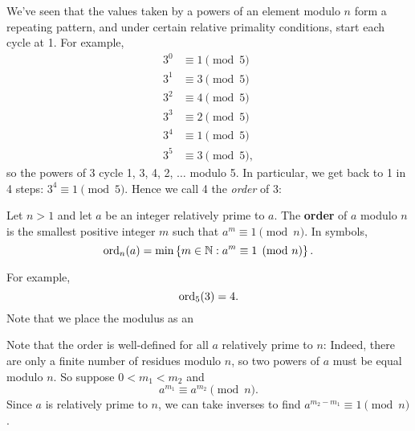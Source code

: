 
We've seen that the values taken by a powers of an element modulo $n$ form a repeating pattern, and under certain relative primality conditions, start each cycle at 1. For example,
\begin{align*}
3^0&\equiv 1\pmod{5}\\
3^1&\equiv 3\pmod{5}\\
3^2&\equiv %
4\pmod{5}\\
3^3&\equiv %
2\pmod{5}\\
3^4&\equiv 1\pmod{5}\\
3^5&\equiv 3\pmod{5}, 
\end{align*}
so the powers of 3 cycle 1, 3, 4, 2, $\ldots$ modulo 5.
In particular, we get back to 1 in 4 steps: $3^4\equiv 1\pmod{5}$. Hence we call 4 the {\it order} of 3:
\begin{df}
Let $n>1$ and let $a$ be an integer relatively prime to $a$. 
The \textbf{order} of $a$ modulo $n$ is the smallest positive integer $m$ such that $a^m\equiv 1\pmod{n}$. In symbols,
\[
\operatorname{ord}_n(a)=\min\left\{{m\in \mathbb{N}}:{a^m\equiv 1\pmod{n}}\right\}.
\]
\end{df}
For example,
\[
\operatorname{ord}_5(3)=4.
\]
Note that we place the modulus as an 

Note that the order is well-defined for all $a$ relatively prime to $n$: Indeed, there are only a finite number of residues modulo $n$, so two powers of $a$ must be equal modulo $n$. So suppose $0<m_1<m_2$ and
\[
a^{m_1}\equiv a^{m_2}\pmod{n}.
\]
Since $a$ is relatively prime to $n$, we can take inverses to find
$a^{m_2-m_1}\equiv 1\pmod{n}$.

